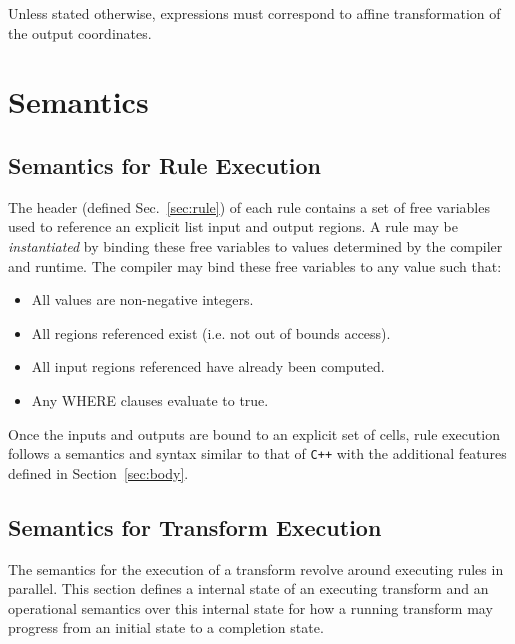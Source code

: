 \documentclass[11pt]{article}
\begin{document}
Unless stated otherwise, expressions must correspond to affine transformation
of the output coordinates.

\section{Semantics}

\subsection{Semantics for Rule Execution}

The header (defined Sec.~\ref{sec:rule}) of each rule contains a set of
free variables used to reference an explicit list input and output regions.
A rule may be {\em instantiated} by binding these free variables to values
determined by the compiler and runtime.  The compiler may bind these free
variables to any value such that:
\begin{itemize}
\item All values are non-negative integers.
\item All regions referenced exist (i.e. not out of bounds access).
\item All input regions referenced have already been computed.
\item Any WHERE clauses evaluate to true.
\end{itemize}

Once the inputs and outputs are bound to an explicit set of cells, rule
execution follows a semantics and syntax similar to that of {\tt C++} with
the additional features defined in Section~\ref{sec:body}.


\subsection{Semantics for Transform Execution}

The semantics for the execution of a transform revolve around executing
rules in parallel.  This section defines a internal state of an executing
transform and an operational semantics over this internal state for how a
running transform may progress from an initial state to a completion state.
\end{document}
